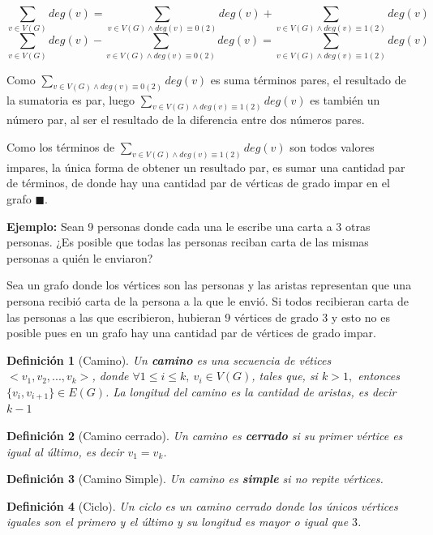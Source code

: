 \documentclass[a4paper,1pt]{report}
\newtheorem*{dfn}{Definición}
\begin{document}
$$\sum_{v \in V(G)} deg(v) = \sum_{v \in V(G) \land deg(v) \equiv 0(2)} deg(v) +  \sum_{v \in V(G) \land deg(v) \equiv 1(2)} deg(v)$$ $$\sum_{v \in V(G)} deg(v) - \sum_{v \in V(G) \land deg(v) \equiv 0(2)} deg(v) =  \sum_{v \in V(G) \land deg(v) \equiv 1(2)} deg(v)$$

Como $\sum_{v \in V(G) \land deg(v) \equiv 0(2)} deg(v)$ es suma t\'erminos pares, el resultado de la sumatoria es par, luego $\sum_{v \in V(G) \land deg(v) \equiv 1(2)} deg(v)$ es tambi\'en un n\'umero par, al ser el resultado de la diferencia entre dos n\'umeros pares.

Como los t\'erminos de $\sum_{v \in V(G) \land deg(v) \equiv 1(2)} deg(v)$ son todos valores impares, la \'unica forma de obtener un resultado par, es sumar una cantidad par de t\'erminos, de donde hay una cantidad par de v\'erticas de grado impar en el grafo $\blacksquare$.

\textbf{Ejemplo:} Sean 9 personas donde cada una le escribe una carta a 3 otras personas. ¿Es posible que todas las personas reciban carta de las mismas personas a quién le enviaron?

Sea un grafo donde los vértices son las personas y las aristas representan que una persona recibió carta de la
persona a la que le envió. Si todos recibieran carta de las personas a las que escribieron, hubieran 9 vértices
de grado 3 y esto no es posible pues en un grafo hay una cantidad par de vértices de grado impar.

\begin{dfn}[Camino]
    Un \textbf{camino} es una secuencia de v\'etices $< v_1,v_2,..., v_k>$, donde $\forall 1\leq i \leq k, ~v_i \in V(G)$, tales que, si $k>1,$ entonces $ \{v_i, v_{i+1}\} \in E(G)$. La longitud del camino es la cantidad de aristas, es decir $k-1$
\end{dfn}

\begin{dfn}[Camino cerrado]
    Un camino es \textbf{cerrado} si su primer v\'ertice es igual al \'ultimo, es decir $v_1 = v_k$.
\end{dfn}

\begin{dfn}[Camino Simple]
    Un camino es \textbf{simple} si no repite v\'ertices.
\end{dfn}

\begin{dfn}[Ciclo]
    Un ciclo es un camino cerrado donde los únicos vértices iguales son el primero y el último y su longitud es mayor o igual que $3$.
\end{dfn}
\end{document}
